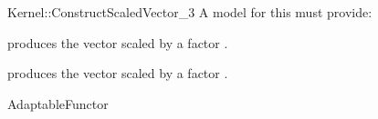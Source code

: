 \begin{ccRefFunctionObjectConcept}{Kernel::ConstructScaledVector_3}
A model for this must provide:



            {produces the vector  scaled by a factor .}

            {produces the vector  scaled by a factor .}


\ccRefines
AdaptableFunctor

\ccSeeAlso
{}\\

\end{ccRefFunctionObjectConcept}
